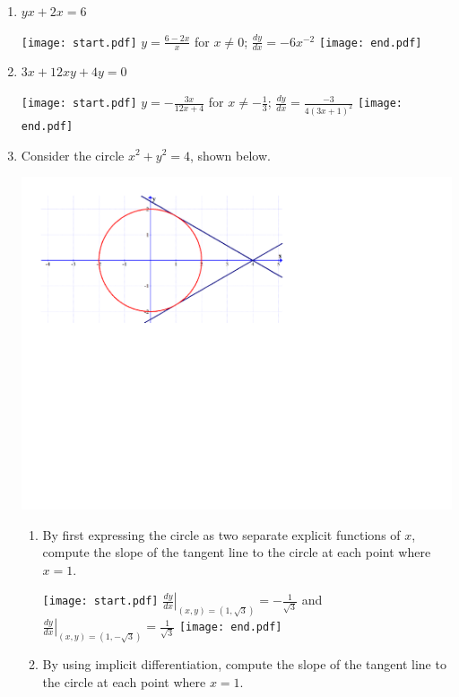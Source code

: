 \documentclass[12pt]{article}
\begin{document}
\begin{enumerate}

\item $yx+2x=6$ 

\texttt{[image: start.pdf]}
{{$y=\frac{6-2x}{x}$ for $x\neq 0$; $\frac{dy}{dx}=-6x^{-2}$}}
\texttt{[image: end.pdf]}


\item $3x+12xy+4y=0$ 

\texttt{[image: start.pdf]}
{{$y=-\frac{3x}{12x+4}$ for $x\neq-\frac{1}{3}$; $\frac{dy}{dx}=\frac{-3}{4(3x+1)^2}$}}
\texttt{[image: end.pdf]}


\item Consider the circle $x^2+y^2=4$, shown below.

\begin{center}
\includegraphics[scale=0.5]{circle.pdf}
\end{center}

\begin{enumerate}

\item By first expressing the circle as two separate explicit functions of $x$, compute the slope of the tangent line to the circle at each point where $x=1$.

\texttt{[image: start.pdf]}
{{$\left.\frac{dy}{dx}\right|_{(x,y)=\left(1,\sqrt{3}\right)}=-\frac{1}{\sqrt{3}}$ and $\left.\frac{dy}{dx}\right|_{(x,y)=\left(1,-\sqrt{3}\right)}=\frac{1}{\sqrt{3}}$}}
\texttt{[image: end.pdf]}


\item By using implicit differentiation, compute the slope of the tangent line to the circle at each point where $x=1$.


\end{enumerate}
\end{enumerate}
\end{document}
